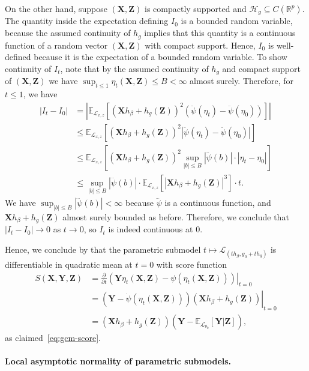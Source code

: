 \documentclass[12pt]{article}
\theoremstyle{definition}
\theoremstyle{remark}
\newcommand{\E}{\mathbb E}								%
\newcommand{\R}{\mathbb{R}}								%
\newcommand{\prx}{\bm X}								%
\newcommand{\prz}{\bm Z}								%
\newcommand{\pry}{{\bm Y}}								%
\newcommand{\law}{\mathcal L}							%
\renewcommand{\H}{\mathcal H}		 					%
\begin{document}
On the other hand, suppose $(\prx,\prz)$ is compactly supported and $\H_g \subseteq C(\R^p)$. The quantity inside the expectation defining $I_0$ is a bounded random variable, because the assumed continuity of $h_g$ implies that this quantity is a continuous function of a random vector $(\prx, \prz)$ with compact support. Hence, $I_0$ is well-defined because it is the expectation of a bounded random variable. To show continuity of $I_t$, note that by the assumed continuity of $h_g$ and compact support of $(\prx,\prz)$ we have $\sup_{t \leq 1} \eta_t(\prx,\prz) \leq B < \infty$ almost surely. Therefore, for $t \leq 1$, we have
\begin{align*}
	|I_t-I_0|
	&
	=\left|\E_{\law_{x,z}}\left[(\prx h_\beta+h_g(\prz))^2(\ddot{\psi}(\eta_t)-\ddot{\psi}(\eta_0))\right]\right|\\
	&
	\leq \E_{\law_{x,z}}\left[(\prx h_\beta+h_g(\prz))^2|\ddot{\psi}(\eta_t)-\ddot{\psi}(\eta_0)|\right]\\
	&
	\leq \E_{\law_{x,z}}\left[(\prx h_\beta+h_g(\prz))^2\sup_{|b| \leq B}|\dddot{\psi}(b)| \cdot |\eta_t-\eta_0|\right]\\
	&
	\leq \sup_{|b| \leq B}|\dddot{\psi}(b)| \cdot \E_{\law_{x,z}}\left[|\prx h_\beta+h_g(\prz)|^3\right] \cdot t.
\end{align*}
We have $\sup_{|b| \leq B}|\dddot{\psi}(b)| < \infty$ because $\dddot \psi$ is a continuous function, and $\prx h_\beta+h_g(\prz)$ almost surely bounded as before. Therefore, we conclude that $|I_t - I_0| \rightarrow 0$ as $t \rightarrow 0$, so $I_t$ is indeed continuous at 0.

Hence, we conclude by \citet[Lemma 7.6]{VDV1998} that the parametric submodel $t \mapsto \law_{(th_\beta, g_0 + th_g)}$ is differentiable in quadratic mean at $t = 0$ with score function
\begin{align*}
S(\prx, \pry, \prz) &= \left.\frac{\partial}{\partial t}(\pry \eta_t(\prx, \prz) - \psi(\eta_t(\prx, \prz)))\right|_{t = 0} \\
&= \left.(\pry-\dot{\psi}(\eta_t(\prx, \prz)))(\prx h_\beta+h_g(\prz))\right|_{t = 0} \\
&= (\prx h_\beta+h_g(\prz))(\pry-\E_{\law_{\theta_0}}[\pry|\prz]),
\end{align*}
as claimed~\eqref{eq:gcm-score}.

\paragraph{Local asymptotic normality of parametric submodels.}
\end{document}

